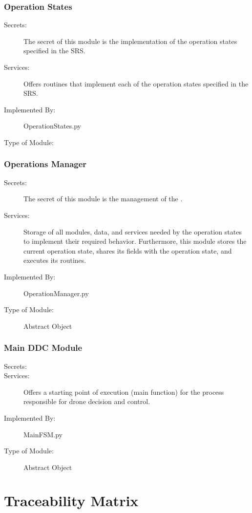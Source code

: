 \documentclass[12pt, titlepage]{article}
\begin{document}
\subsubsection{Operation States}
\label{Operation States}
\begin{description}
\item[Secrets:] The secret of this module is the implementation of the operation states specified in the SRS.
\item[Services:] Offers routines that implement each of the operation states specified in the SRS.
\item[Implemented By:] OperationStates.py
\item[Type of Module:] 
\end{description}

\subsubsection{Operations Manager}
\label{Operations Manager}
\begin{description}
\item[Secrets:] The secret of this module is the management of the .  
\item[Services:] Storage of all modules, data, and services needed by the operation states to implement their required behavior. Furthermore, this module stores the current operation state, shares its fields with the operation state, and executes its routines.
\item[Implemented By:] OperationManager.py
\item[Type of Module:] Abstract Object
\end{description}

\subsubsection{Main DDC Module}
\label{Main DDC Module}
\begin{description}
\item[Secrets:] 
\item[Services:] Offers a starting point of execution (main function) for the process responsible for drone decision and control.
\item[Implemented By:] MainFSM.py
\item[Type of Module:] Abstract Object
\end{description}

\section{Traceability Matrix} \label{SecTM}
\end{document}
